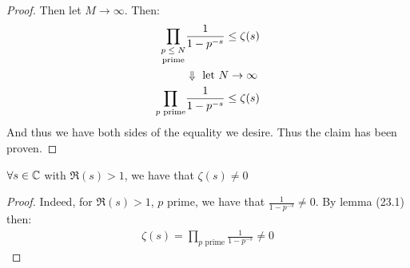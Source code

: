 \begin{proof}
Then let $M \to \infty$. Then:
\begin{align*}
    \prod_{\text{\stackanchor{$p \leq N$}{prime}}} &\frac{1}{1-p^{-s}} \leq \zeta(s)\\
    &\Downarrow \text{ let $N \to \infty$}\\
    \prod_{p \text{ prime}} &\frac{1}{1-p^{-s}} \leq \zeta(s)
\end{align*}
And thus we have both sides of the equality we desire. Thus the claim has been proven.

\end{proof}

\begin{corollary}
$\forall s \in \mathbb{C}$ with $\Re(s) > 1$, we have that $\zeta(s) \neq 0$
\end{corollary}
\begin{proof}
Indeed, for $\Re(s) > 1$, $p$ prime, we have that $\frac{1}{1-p^{-s}} \neq 0$. By lemma (23.1) then:
\begin{align*}
    \zeta(s) = \prod_{p \text{ prime}} \frac{1}{1-p^{-s}} \neq 0
\end{align*}
\end{proof}

